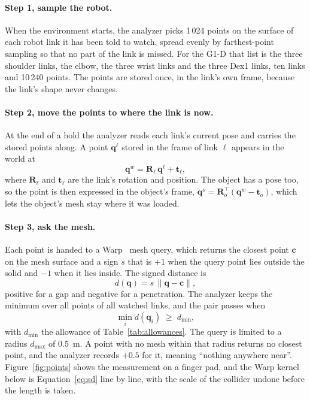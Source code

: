 \paragraph{Step 1, sample the robot.} When the environment starts, the analyzer picks 1\,024 points on the surface of each robot link it has been told to watch, spread evenly by farthest-point sampling so that no part of the link is missed. For the G1-D that list is the three shoulder links, the elbow, the three wrist links and the three Dex1 links, ten links and 10\,240 points. The points are stored once, in the link's own frame, because the link's shape never changes.

\paragraph{Step 2, move the points to where the link is now.} At the end of a hold the analyzer reads each link's current pose and carries the stored points along. A point $\mathbf{q}^{\ell}$ stored in the frame of link $\ell$ appears in the world at
\begin{equation}
  \mathbf{q}^{w} = \mathbf{R}_{\ell}\,\mathbf{q}^{\ell} + \mathbf{t}_{\ell},
  \label{eq:ride}
\end{equation}
where $\mathbf{R}_{\ell}$ and $\mathbf{t}_{\ell}$ are the link's rotation and position. The object has a pose too, so the point is then expressed in the object's frame, $\mathbf{q}^{o} = \mathbf{R}_{o}^{\top}(\mathbf{q}^{w} - \mathbf{t}_{o})$, which lets the object's mesh stay where it was loaded.

\paragraph{Step 3, ask the mesh.} Each point is handed to a Warp~\cite{macklin2022warp} mesh query, which returns the closest point $\mathbf{c}$ on the mesh surface and a sign $s$ that is $+1$ when the query point lies outside the solid and $-1$ when it lies inside. The signed distance is
\begin{equation}
  d(\mathbf{q}) = s\,\lVert \mathbf{q} - \mathbf{c} \rVert,
  \label{eq:sd}
\end{equation}
positive for a gap and negative for a penetration. The analyzer keeps the minimum over all points of all watched links, and the pair passes when
\begin{equation}
  \min_i d(\mathbf{q}_i) \;\ge\; d_{\min},
  \label{eq:pass}
\end{equation}
with $d_{\min}$ the allowance of Table~\ref{tab:allowances}. The query is limited to a radius $d_{\max}$ of 0.5~m. A point with no mesh within that radius returns no closest point, and the analyzer records $+0.5$ for it, meaning ``nothing anywhere near''. Figure~\ref{fig:points} shows the measurement on a finger pad, and the Warp kernel below is Equation~\eqref{eq:sd} line by line, with the scale of the collider undone before the length is taken.

